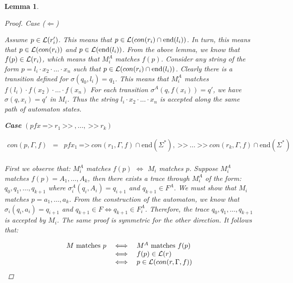 \documentclass[twocolumn, openany]{sig-alternate-10pt}
\newcommand{\Prefer}{\texttt{>>}}
\newcommand{\Path}{\texttt{=>}}
\newtheorem{lem}[thm]{Lemma}
\begin{document}
\begin{lem}
\begin{proof}
    \vspace{1em}
    Case ($\Leftarrow$)

    Assume $p \in \mathcal{L}(r'_i)$. This means that $p \in \mathcal{L}(con(r_i) \cap \text{end}(l_i))$. In turn, this means that $p \in \mathcal{L}(con(r_i))$ and $p \in \mathcal{L}(\text{end}(l_i))$. From the above lemma, we know that $f(p) \in \mathcal{L}(r_i)$, which means that $M^A_i$ matches $f(p)$. 
    Consider any string of the form $p = l_i \cdot x_2 \cdot \dots \cdot x_n$ such that $p \in \mathcal{L}(con(r_i) \cap \text{end}(l_i))$. Clearly there is a transition defined for $\sigma(q_0,l_i) = q_1$.
    This means that $M^A_i$ matches $f(l_i) \cdot f(x_2) \cdot \dots \cdot f(x_n)$
    For each transition $\sigma^A(q,f(x_i)) = q'$, we have $\sigma(q,x_i) = q'$ in $M_i$.
    Thus the string $l_i \cdot x_2 \cdot \dots \cdot x_n$ is accepted along the same path of automaton states.

  \vspace{1em}

  \textbf{Case} $(pfx ~\Path~ r_1 ~\Prefer~,\dots, ~\Prefer~ r_k)$

    \[ \begin{array}{lcl}
      con(p,\Gamma,f) &=& pfx_1 ~\Path~ con(r_1,\Gamma,f) \cap \text{end}(\Sigma^*), ~\Prefer~ \dots ~\Prefer~ con(r_k,\Gamma,f) \cap \text{end}(\Sigma^*) \\
    \end{array} \]

    First we observe that: $M^A_i$ matches $f(p)$ $\iff$ $M_i$ matches $p$.
    Suppose $M^A_i$ matches $f(p) = A_1, \dots, A_k$, then there exists a trace through $M^A_i$ of the form:%
    $q_0, q_1, \dots, q_{k+1}$
    where $\sigma^A_i(q_i, A_i) = q_{i+1}$ and $q_{k+1} \in F^A$. We must show that $M_i$ matches $p = a_1, \dots, a_k$. %
    From the construction of the automaton, we know that $\sigma_i(q_i, a_i) = q_{i+1}$ and $q_{k+1} \in F \iff q_{k+1} \in F^A_i$. Therefore, the trace $q_0, q_1, \dots, q_{k+1}$ is accepted by $M_i$. 
    The same proof is symmetric for the other direction. It follows that:

    \[ \begin{array}{lll}
      M ~\text{matches}~ p &\iff& M^A ~\text{matches}~ f(p) \\
                         &\iff& f(p) \in \mathcal{L}(r) \\
                         &\iff& p \in \mathcal{L}(con(r,\Gamma,f)) \\
    \end{array} \]%

  \end{proof}

\end{lem}
\end{document}

